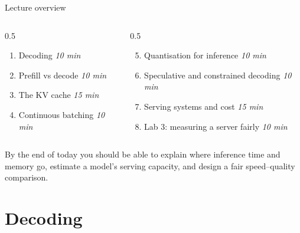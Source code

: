 \documentclass[aspectratio=169,10pt]{beamer}
\begin{document}
\begin{frame}{Lecture overview}
  \begin{columns}[T]
    \begin{column}{0.5\textwidth}
      \begin{enumerate}
        \item Decoding \hfill \textit{10 min}
        \item Prefill vs decode \hfill \textit{10 min}
        \item The KV cache \hfill \textit{15 min}
        \item Continuous batching \hfill \textit{10 min}
      \end{enumerate}
    \end{column}
    \begin{column}{0.5\textwidth}
      \begin{enumerate}
        \setcounter{enumi}{4}
        \item Quantisation for inference \hfill \textit{10 min}
        \item Speculative and constrained decoding \hfill \textit{10 min}
        \item Serving systems and cost \hfill \textit{15 min}
        \item Lab 3: measuring a server fairly \hfill \textit{10 min}
      \end{enumerate}
    \end{column}
  \end{columns}
  \vfill
  \begin{takeaway}
    By the end of today you should be able to explain where inference time and
    memory go, estimate a model's serving capacity, and design a fair
    speed--quality comparison.
  \end{takeaway}
\end{frame}

\section{Decoding}
\end{document}
